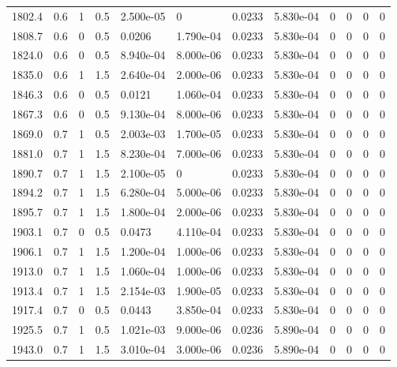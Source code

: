 \documentclass[preview]{standalone}
\begin{document}
{{{{{{{{{\begin{tabular}{L{1.2cm}C{1.2cm} C{0.3cm}C{0.5cm} C{1.4cm}C{1.4cm} C{1.4cm}C{1.4cm} C{1.6cm}C{1.6cm} C{1.6cm}C{1.6cm}}
  1802.4  &   0.6  & 1     & 0.5 &  2.500e-05  & 0  &  0.0233&   5.830e-04& 0 & 0   &  0 & 0  \\ 
  1808.7  &   0.6  & 0     & 0.5 &  0.0206  & 1.790e-04  &  0.0233&   5.830e-04& 0 & 0   &  0 & 0  \\ 
  1824.0  &   0.6  & 0     & 0.5 &  8.940e-04  & 8.000e-06  &  0.0233&   5.830e-04& 0 & 0   &  0 & 0  \\ 
  1835.0  &   0.6  & 1     & 1.5 &  2.640e-04  & 2.000e-06  &  0.0233&   5.830e-04& 0 & 0   &  0 & 0  \\ 
  1846.3  &   0.6  & 0     & 0.5 &  0.0121  & 1.060e-04  &  0.0233&   5.830e-04& 0 & 0   &  0 & 0  \\ 
  1867.3  &   0.6  & 0     & 0.5 &  9.130e-04  & 8.000e-06  &  0.0233&   5.830e-04& 0 & 0   &  0 & 0  \\ 
  1869.0  &   0.7  & 1     & 0.5 &  2.003e-03  & 1.700e-05  &  0.0233&   5.830e-04& 0 & 0   &  0 & 0  \\ 
  1881.0  &   0.7  & 1     & 1.5 &  8.230e-04  & 7.000e-06  &  0.0233&   5.830e-04& 0 & 0   &  0 & 0  \\ 
  1890.7  &   0.7  & 1     & 1.5 &  2.100e-05  & 0  &  0.0233&   5.830e-04& 0 & 0   &  0 & 0  \\ 
  1894.2  &   0.7  & 1     & 1.5 &  6.280e-04  & 5.000e-06  &  0.0233&   5.830e-04& 0 & 0   &  0 & 0  \\ 
  1895.7  &   0.7  & 1     & 1.5 &  1.800e-04  & 2.000e-06  &  0.0233&   5.830e-04& 0 & 0   &  0 & 0  \\ 
  1903.1  &   0.7  & 0     & 0.5 &  0.0473  & 4.110e-04  &  0.0233&   5.830e-04& 0 & 0   &  0 & 0  \\ 
  1906.1  &   0.7  & 1     & 1.5 &  1.200e-04  & 1.000e-06  &  0.0233&   5.830e-04& 0 & 0   &  0 & 0  \\ 
  1913.0  &   0.7  & 1     & 1.5 &  1.060e-04  & 1.000e-06  &  0.0233&   5.830e-04& 0 & 0   &  0 & 0  \\ 
  1913.4  &   0.7  & 1     & 1.5 &  2.154e-03  & 1.900e-05  &  0.0233&   5.830e-04& 0 & 0   &  0 & 0  \\ 
  1917.4  &   0.7  & 0     & 0.5 &  0.0443  & 3.850e-04  &  0.0233&   5.830e-04& 0 & 0   &  0 & 0  \\ 
  1925.5  &   0.7  & 1     & 0.5 &  1.021e-03  & 9.000e-06  &  0.0236&   5.890e-04& 0 & 0   &  0 & 0  \\ 
  1943.0  &   0.7  & 1     & 1.5 &  3.010e-04  & 3.000e-06  &  0.0236&   5.890e-04& 0 & 0   &  0 & 0  \\ 

\end{tabular}}}}}}}}}}
\end{document}
